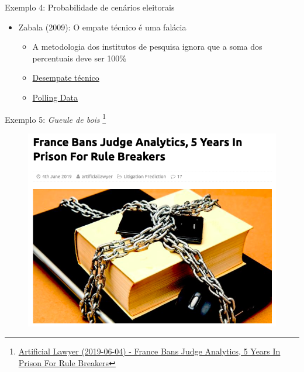 \documentclass{beamer}
\newcommand\blfootnote[1]{%
  \begingroup
  \renewcommand\thefootnote{}\footnote{#1}%
  \addtocounter{footnote}{-1}%
  \endgroup
}
\begin{document}
\begin{frame}{Exemplo 4: Probabilidade de cenários eleitorais}
\begin{itemize}
\item Zabala (2009): O empate técnico é uma falácia
  \begin{itemize}
  \pause
  \item A metodologia dos institutos de pesquisa ignora que a soma dos percentuais deve ser 100\%
  \pause
  \item \href{http://www.estatisticaclassica.com/jurimetria/dt.html}{Desempate técnico}
  \pause
  \item \href{http://www.pollingdata.com.br/}{Polling Data}
  \end{itemize}
\end{itemize}
\end{frame}

\begin{frame}{Exemplo 5: \textit{Gueule de bois}}
\blfootnote{\tiny{\href{https://www.artificiallawyer.com/2019/06/04/france-bans-judge-analytics-5-years-in-prison-for-rule-breakers/}{Artificial Lawyer (2019-06-04) - France Bans Judge Analytics, 5 Years In Prison For Rule Breakers}}}
\begin{figure}
\includegraphics[scale=0.35]{franca}
\end{figure}
\end{frame}
\end{document}

